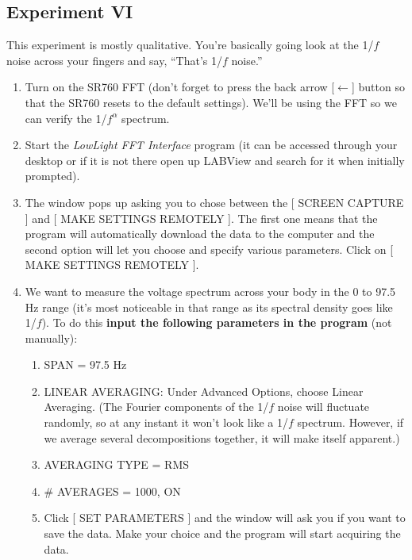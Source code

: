 \documentclass{../lab}
\begin{document}
\subsection{Experiment VI}

This experiment is mostly qualitative. You're basically going look at the 1/$f$ noise across your fingers and say, ``That's 1/$f$ noise.''

\begin{enumerate}
    \item Turn on the SR760 FFT (don't forget to press the back arrow [$\leftarrow$] button so that the SR760 resets to the default settings). We'll be using the FFT so we can verify the 1/$f^\alpha$ spectrum.

    \item Start the \emph{LowLight FFT Interface} program (it can be accessed through your desktop or if it is not there open up LABView and search for it when initially prompted).

    \item The window pops up asking you to chose between the [ SCREEN CAPTURE ] and [ MAKE SETTINGS REMOTELY ]. The first one means that the program will automatically download the data to the computer and the second option will let you choose and specify various parameters. Click on [ MAKE SETTINGS REMOTELY ].

    \item We want to measure the voltage spectrum across your body in the 0 to 97.5 Hz range (it's most noticeable in that range as its spectral density goes like 1/$f$). To do this \textbf{input the following parameters in the program} (not manually):
    \begin{enumerate}
        \item SPAN = 97.5 Hz

        \item LINEAR AVERAGING: Under Advanced Options, choose Linear Averaging. (The Fourier components of the 1/$f$ noise will fluctuate randomly, so at any instant it won't look like a 1/$f$ spectrum. However, if we average several decompositions together, it will make itself apparent.)

        \item AVERAGING TYPE = RMS

        \item \# AVERAGES = 1000, ON

        \item Click [ SET PARAMETERS ] and the window will ask you if you want to save the data. Make your choice and the program will start acquiring the data.


\end{enumerate}
\end{enumerate}
\end{document}
